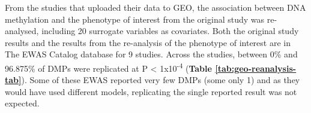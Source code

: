 \documentclass[11pt,twoside]{bristolthesis}
\begin{document}
From the studies that uploaded their data to GEO, the association between DNA methylation and the phenotype of interest from the original study was re-analysed, including 20 surrogate variables as covariates. Both the original study results and the results from the re-analysis of the phenotype of interest are in The EWAS Catalog database for 9 studies. Across the studies, between 0\% and 96.875\% of DMPs were replicated at P \textless{} 1x10\textsuperscript{-4} (\textbf{Table \ref{tab:geo-reanalysis-tab}}). Some of these EWAS reported very few DMPs (some only 1) and as they would have used different models, replicating the single reported result was not expected.
\begin{table}[H]

\caption{\label{tab:geo-reanalysis-tab}GEO re-analysis replication}
\centering
{}
\end{table}
\end{document}
